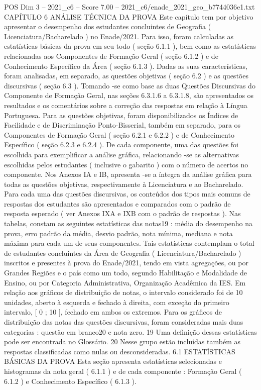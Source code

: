 \begin{textsample}{POS Dim 3 – 2021\_c6 – Score 7.00 – 2021\_c6/enade\_2021\_geo\_b7744036e1.txt}  \label{ex:f3_pos_044}
CAPÍTULO 6 ANÁLISE TÉCNICA DA PROVA Este capítulo tem por objetivo apresentar o desempenho dos estudantes concluintes de Geografia ( Licenciatura/Bacharelado ) no Enade/2021.
Para isso, foram calculadas as estatísticas básicas da prova em seu todo ( seção 6.1.1 ), bem como as estatísticas relacionadas aos Componentes de Formação Geral ( seção 6.1.2 ) e de Conhecimento Específico da Área ( seção 6.1.3 ).
Dadas as suas características, foram analisadas, em separado, as questões objetivas ( seção 6.2 ) e as questões discursivas ( seção 6.3 ).
Tomando -se como base as duas Questões Discursivas do Componente de Formação Geral, nas seções 6.3.1.6 a 6.3.1.8, são apresentados os resultados e os comentários sobre a correção das respostas em relação à Língua Portuguesa.
Para as questões objetivas, foram disponibilizados os Índices de Facilidade e de Discriminação Ponto-Bisserial, também em separado, para os Componentes de Formação Geral ( seção 6.2.1 e 6.2.2 ) e de Conhecimento Específico ( seção 6.2.3 e 6.2.4 ).
De cada componente, uma das questões foi escolhida para exemplificar a análise gráfica, relacionando -se as alternativas escolhidas pelos estudantes ( inclusive o gabarito ) com o número de acertos no componente.
Nos Anexos IA e IB, apresenta -se a íntegra da análise gráfica para todas as questões objetivas, respectivamente à Licenciatura e ao Bacharelado.
Para cada uma das questões discursivas, os conteúdos dos tipos mais comuns de respostas dos estudantes são apresentados e comparados com o padrão de resposta esperado ( ver Anexos IXA e IXB com o padrão de respostas ).
Nas tabelas, constam as seguintes estatísticas das notas19 : média do desempenho na prova, erro padrão da média, desvio padrão, nota mínima, mediana e nota máxima para cada um de seus componentes.
Tais estatísticas contemplam o total de estudantes concluintes da Área de Geografia ( Licenciatura/Bacharelado ) inscritos e presentes à prova do Enade/2021, tendo em vista agregações, ou por Grandes Regiões e o país como um todo, segundo Habilitação e Modalidade de Ensino, ou por Categoria Administrativa, Organização Acadêmica da IES.
Em relação aos gráficos de distribuição de notas, o intervalo considerado foi de 10 unidades, aberto à esquerda e fechado à direita, com exceção do primeiro intervalo, [ 0 ; 10 ], fechado em ambos os extremos.
Para os gráficos de distribuição das notas das questões discursivas, foram consideradas mais duas categorias : questão em branco20 e nota zero. 19 Uma definição dessas estatísticas pode ser encontrada no Glossário. 20 Nesse grupo estão incluídas também as respostas classificadas como nulas ou desconsideradas. 6.1 ESTATÍSTICAS BÁSICAS DA PROVA Esta seção apresenta estatísticas selecionadas e histogramas da nota geral ( 6.1.1 ) e de cada componente : Formação Geral ( 6.1.2 ) e Conhecimento Específico ( 6.1.3 ).

\end{textsample}
